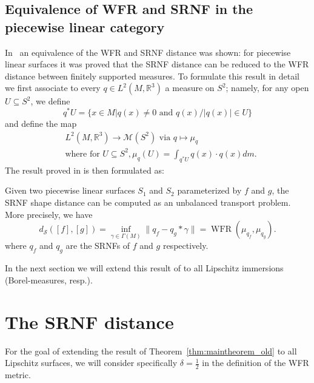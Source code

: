 \documentclass[final,hidelinks,onefignum,onetabnum]{siamart220329}
\newcommand{\WFR}{\operatorname{WFR}}
\begin{document}
\subsection{Equivalence of WFR and SRNF in the piecewise linear category}
In~\cite{bauer2022SRNF} an equivalence of the WFR and SRNF distance was shown: for piecewise linear surfaces it was proved that the SRNF distance can be reduced to the WFR distance between finitely supported measures. To formulate this result in detail we 
first associate to every $q\in L^2(M,\mathbb{R}^3)$ a measure on $S^2$; namely, for any open $U\subseteq S^2$,  we define 
\begin{equation*}
    q^*U=\{x\in M|q(x)\neq 0 \text{ and } q(x)/|q(x)| \in U \}
\end{equation*}
and define the map
\begin{align*}\label{eq:psi_def}
     &L^2(M,\mathbb{R}^3)\to\mathcal{M}(S^2)\text{ via }q\mapsto\mu_q\\ 
     &\text{where for } U\subseteq S^2, \mu_q(U)=\int_{q^*U}q(x)\cdot q(x)dm.
\end{align*}
The result proved in \cite{bauer2022SRNF} is then formulated as:
\begin{theorem}\label{thm:maintheorem_old}
Given two piecewise linear surfaces $S_1$ and $S_2$ parameterized by $f$ and $g$, the SRNF shape distance can be computed as an unbalanced transport problem. More precisely, we have  
\begin{equation*}
    d_{\mathcal S}([f],[g])=\inf_{\gamma\in\Gamma(M)}\|q_f-q_g*\gamma\|=\WFR(\mu_{q_f},\mu_{q_g}).
\end{equation*}
where $q_f$ and $q_g$ are the SRNFs of $f$ and $g$ respectively.
\end{theorem} 
\noindent In the next section we will  extend this result of  to all Lipschitz immersions (Borel-measures, resp.). 



\section{The SRNF distance}
For the goal of extending the result of Theorem~\ref{thm:maintheorem_old} to all Lipschitz surfaces, we will consider specifically $\delta=\frac{1}{2}$ in the definition of the WFR metric. 
\end{document}
